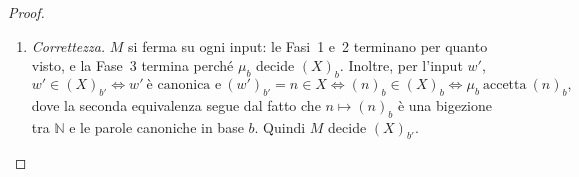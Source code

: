 \begin{prop}
\begin{proof}
\begin{enumerate}
    \item[4.] \emph{Correttezza.} $M$ si ferma su ogni input: le Fasi~1 e~2 terminano per quanto visto, e la Fase~3 termina perché $\mu_b$ decide $(X)_b$. Inoltre, per l'input $w'$,
    \[
    w'\in(X)_{b'}
    \iff w'\ \text{è canonica e}\ (w')_{b'}=n\in X
    \iff (n)_b\in(X)_b
    \iff \mu_b\ \text{accetta}\ (n)_b,
    \]
    dove la seconda equivalenza segue dal fatto che $n\mapsto(n)_b$ è una bigezione tra $\mathbb{N}$ e le parole canoniche in base $b$. Quindi $M$ decide $(X)_{b'}$.
\end{enumerate}
\end{proof}
\end{prop}


